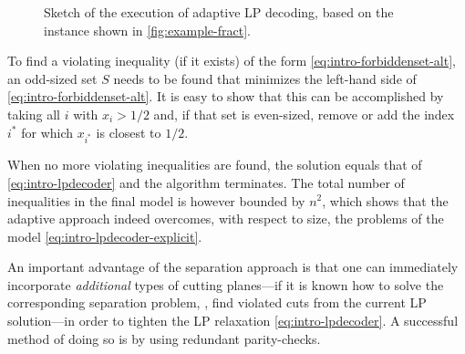 \begin{figure}
{
  }
  \caption{Sketch of the execution of adaptive LP decoding, based on the instance shown in \cref{fig:example-fract}.}
  \label{fig:example-alp}
\end{figure}
To find a violating inequality (if it exists) of the form \cref{eq:intro-forbiddenset-alt}, an odd-sized set $S$ needs to be found that minimizes the left-hand side of \cref{eq:intro-forbiddenset-alt}. It is easy to show \cite{Taghavi+11EfficientLPD} that this can be accomplished by taking all $i$ with $x_i > 1/2$ and, if that set is even-sized, remove or add the index $i^*$ for which $x_{i^*}$ is closest to $1/2$.

When no more violating inequalities are found, the solution equals that of \cref{eq:intro-lpdecoder} and the algorithm terminates. The total number of inequalities in the final model is however bounded by $n^2$, which shows that the adaptive approach indeed overcomes, with respect to size, the problems of the model \cref{eq:intro-lpdecoder-explicit}.

An important advantage of the separation approach is that one can immediately incorporate \emph{additional} types of cutting planes—if it is known how to solve the corresponding separation problem, \ie, find violated cuts from the current LP solution—in order to tighten the LP relaxation \cref{eq:intro-lpdecoder}. A successful method of doing so is by using redundant parity-checks.

